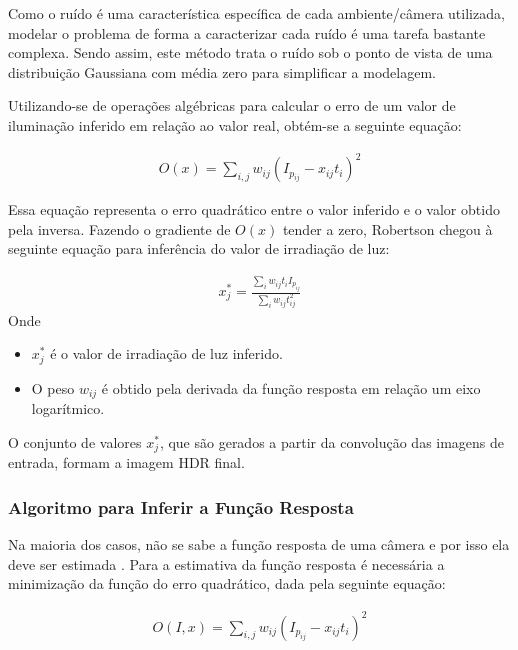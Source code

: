Como o ruído é uma característica específica de cada ambiente/câmera utilizada, modelar o problema de forma a caracterizar cada ruído é uma tarefa bastante complexa. Sendo assim, este método trata o ruído sob o ponto de vista de uma distribuição Gaussiana com média zero para simplificar a modelagem.

Utilizando-se de operações algébricas para calcular o erro de um valor de iluminação inferido em relação ao valor real, obtém-se a seguinte equação:

\begin{align} \label{eqRobertsonErr}
	O(x) = \sum\limits_{i,j}{w_{ij}(I_{p_{ij}} - x_{ij}t_{i})^2}
\end{align}

Essa equação representa o erro quadrático entre o valor inferido e o valor obtido pela inversa. Fazendo o gradiente de $O(x)$ tender a zero, Robertson chegou à seguinte equação para inferência do valor de irradiação de luz:

\begin{align} \label{eqRobertsonGeracao}
	x^{*}_j = \frac{\sum\limits_i{w_{ij}t_{i}I_{p_{ij}}}}{\sum\limits_i{w_{ij}t_{ij}^{2}}}
\end{align}
Onde
\begin{itemize}
\item $x^{*}_j$ é o valor de irradiação de luz inferido.
\item O peso $w_{ij}$ é obtido pela derivada da função resposta em relação um eixo logarítmico. 
\end{itemize}

O conjunto de valores $x^{*}_j$, que são gerados a partir da convolução das imagens de entrada, formam a imagem HDR final.

\subsubsection{Algoritmo para Inferir a Função Resposta} \label{metodoRobertsonAlg}

Na maioria dos casos, não se sabe a função resposta de uma câmera e por isso ela deve ser estimada \cite{robertson}. Para a estimativa da função resposta é necessária a minimização da função do erro quadrático, dada pela seguinte equação:

\begin{align} \label{eqRobertsonErr2}
	O(I,x) = \sum\limits_{i,j}{w_{ij}(I_{p_{ij}} - x_{ij}t_{i})^2}
\end{align}


